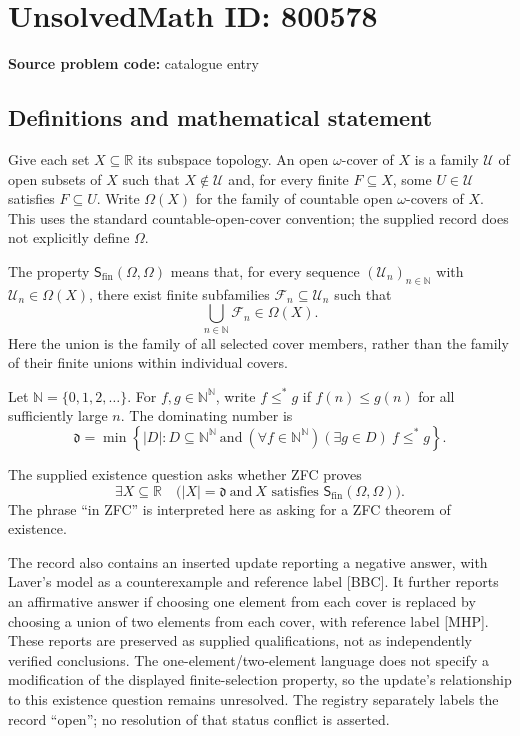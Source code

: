 \documentclass[11pt]{article}
\newcommand{\N}{\mathbb{N}}
\newcommand{\R}{\mathbb{R}}
\begin{document}
\section*{UnsolvedMath ID: 800578}
\textbf{Source problem code:} catalogue entry
\subsection{Definitions and mathematical statement}
Give each set \(X\subseteq\R\) its subspace topology. An open \(\omega\)-cover of \(X\) is a family \(\mathcal U\) of open subsets of \(X\) such that \(X\notin\mathcal U\) and, for every finite \(F\subseteq X\), some \(U\in\mathcal U\) satisfies \(F\subseteq U\). Write \(\Omega(X)\) for the family of countable open \(\omega\)-covers of \(X\). This uses the standard countable-open-cover convention; the supplied record does not explicitly define \(\Omega\).

The property \(\mathsf S_{\mathrm{fin}}(\Omega,\Omega)\) means that, for every sequence \((\mathcal U_n)_{n\in\N}\) with \(\mathcal U_n\in\Omega(X)\), there exist finite subfamilies \(\mathcal F_n\subseteq\mathcal U_n\) such that
\[
\bigcup_{n\in\N}\mathcal F_n\in\Omega(X).
\]
Here the union is the family of all selected cover members, rather than the family of their finite unions within individual covers.

Let \(\N=\{0,1,2,\ldots\}\). For \(f,g\in\N^{\N}\), write \(f\leq^{*}g\) if \(f(n)\leq g(n)\) for all sufficiently large \(n\). The dominating number is
\[
\mathfrak d=\min\left\{|D|:D\subseteq\N^{\N}\ \text{and}\ (\forall f\in\N^{\N})(\exists g\in D)\ f\leq^{*}g\right\}.
\]

The supplied existence question asks whether ZFC proves
\[
\exists X\subseteq\R\quad\bigl(|X|=\mathfrak d\ \text{and}\ X\text{ satisfies }\mathsf S_{\mathrm{fin}}(\Omega,\Omega)\bigr).
\]
The phrase ``in ZFC'' is interpreted here as asking for a ZFC theorem of existence.

The record also contains an inserted update reporting a negative answer, with Laver's model as a counterexample and reference label [BBC]. It further reports an affirmative answer if choosing one element from each cover is replaced by choosing a union of two elements from each cover, with reference label [MHP]. These reports are preserved as supplied qualifications, not as independently verified conclusions. The one-element/two-element language does not specify a modification of the displayed finite-selection property, so the update's relationship to this existence question remains unresolved. The registry separately labels the record ``open''; no resolution of that status conflict is asserted.
\end{document}
